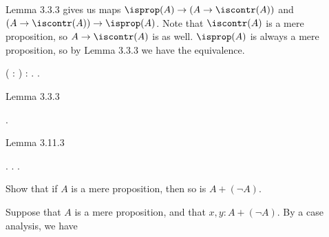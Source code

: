  \soln
Lemma 3.3.3 gives us maps $\isprop(A) \to (A \to \iscontr(A))$ and $(A
\to \iscontr(A)) \to \isprop(A)$.  Note that $\iscontr(A)$ is a mere
proposition, so $A \to \iscontr(A)$ is as well.  $\isprop(A)$ is
always a mere proposition, so by Lemma 3.3.3 we have the equivalence.
\begin{coqdoccode}
\coqdocemptyline
\coqdocnoindent
{}  ( : ) :   \coqdocnotation{\ensuremath{\eqvsym}} \coqdocnotation{(}   \coqdocnotation{)}.\coqdoceol
\coqdocnoindent
{}.\coqdoceol
\coqdocindent{1.00em}
\begin{coqdoccomment}
\coqdocindent{0.50em}
Lemma\coqdocindent{0.50em}
3.3.3\coqdocindent{0.50em}
\end{coqdoccomment}
\coqdoceol
\coqdocindent{1.00em}
 .\coqdoceol
\coqdocindent{1.00em}
\begin{coqdoccomment}
\coqdocindent{0.50em}
Lemma\coqdocindent{0.50em}
3.11.3\coqdocindent{0.50em}
\end{coqdoccomment}
\coqdoceol
\coqdocindent{1.00em}
 .\coqdoceol
\coqdocindent{1.00em}
 .\coqdoceol
\coqdocnoindent
{}.\coqdoceol
\coqdocemptyline
\end{coqdoccode}
Show that if $A$ is a mere proposition, then so is $A + (\lnot A)$.


 \soln
Suppose that $A$ is a mere proposition, and that $x, y : A + (\lnot A)$.  By a
case analysis, we have



